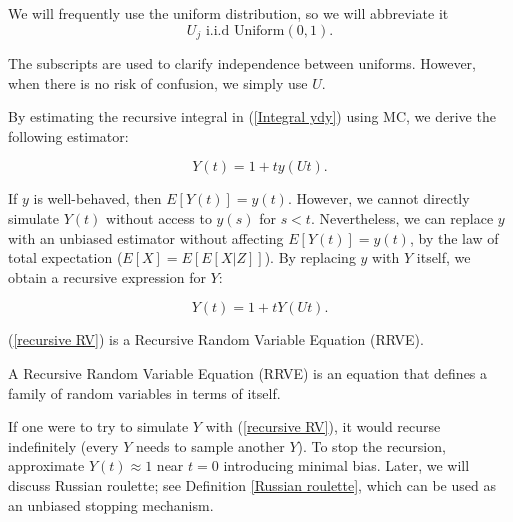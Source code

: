 \documentclass[a4paper,12pt]{article}
\begin{document}
\begin{notation}[$U,U_{j}$]
  We will frequently use the uniform distribution, so we will abbreviate it
  \begin{equation}
    U_{j}  \text{ i.i.d Uniform}(0,1).
  \end{equation}

  The subscripts are used to clarify independence
  between uniforms. However,
  when there is no risk of confusion,
  we simply use $U$.

\end{notation}

By estimating the recursive integral in (\ref{Integral ydy})
using MC, we derive the following estimator:

\begin{equation}
  Y(t) = 1 + t  y(Ut).
\end{equation}


If $y$ is well-behaved, then $E[Y(t)] = y(t)$.
However, we cannot directly simulate $Y(t)$ without access
to $y(s)$ for $s < t$. Nevertheless, we can replace $y$ with
an unbiased estimator without affecting $E[Y(t)] = y(t)$,
by the law of total expectation ($E[X] = E[E[X|Z]]$).
By replacing $y$ with $Y$ itself, we obtain a recursive
expression for $Y$:

\begin{equation} \label{recursive RV}
  Y(t) = 1 + t  Y(Ut).
\end{equation}


(\ref{recursive RV}) is a Recursive Random Variable
Equation (RRVE).

\begin{definition}
  A Recursive Random Variable Equation (RRVE) is
  an equation that defines a
  family of random variables in terms of itself.
\end{definition}

If one were to try to simulate $Y$ with (\ref{recursive RV}),
it would recurse indefinitely (every $Y$ needs to sample another $Y$).
To stop the recursion, approximate
$Y(t) \approx 1$ near $t = 0$ introducing minimal bias.
Later, we will discuss Russian roulette; see Definition \ref{Russian roulette},
which can be used as an unbiased stopping mechanism.


\end{document}
